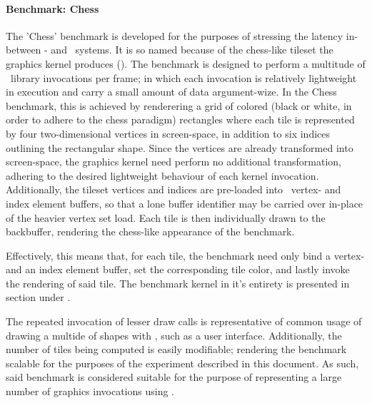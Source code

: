 \paragraph{Benchmark: Chess}
\label{par:methodologyexperiment_benchmarking_benchmarkchess}
The 'Chess' benchmark is developed for the purposes of stressing the latency in-between \dvttermtarget - and \dvttermhost\ systems.
It is so named because of the chess-like tileset the graphics kernel produces ().
The benchmark is designed to perform a multitude of \dvttermopenglestwopointo\ library invocations per frame; in which each invocation is relatively lightweight in execution and carry a small amount of data argument-wize.
In the Chess benchmark, this is achieved by renderering a grid of colored (black or white, in order to adhere to the chess paradigm) rectangles where each tile is represented by four two-dimensional vertices in screen-space, in addition to six indices outlining the rectangular shape.
Since the vertices are already transformed into screen-space, the graphics kernel need perform no additional transformation, adhering to the desired lightweight behaviour of each kernel invocation.
Additionally, the tileset vertices and indices are pre-loaded into \dvttermopengl\ vertex- and index element buffers, so that a lone buffer identifier may be carried over in-place of the heavier vertex set load.
Each tile is then individually drawn to the backbuffer, rendering the chess-like appearance of the benchmark.

Effectively, this means that, for each tile, the benchmark need only bind a vertex- and an index element buffer, set the corresponding tile color, and lastly invoke the rendering of said tile.
The benchmark kernel in it's entirety is presented in section  under .

The repeated invocation of lesser draw calls is representative of common usage of drawing a multide of shapes with \dvttermopengl , such as a user interface. Additionally, the number of tiles being computed is easily modifiable; rendering the benchmark scalable for the purposes of the experiment described in this document. As such, said benchmark is considered suitable for the purpose of representing a large number of graphics invocations using \dvttermopenglestwopointo .

